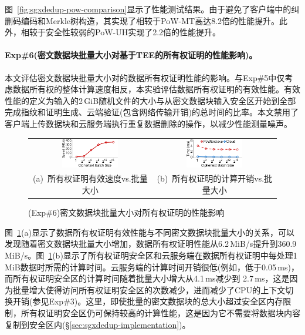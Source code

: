 图~\ref{fig:sgxdedup-pow-comparison}显示了性能测试结果。由于\sysnameS 避免了客户端中的纠删码编码和Merkle树构造，其实现了相较于PoW-MT高达8.2倍的性能提升。此外，\sysnameS 相较于安全性较弱的PoW-UH实现了2.2倍的性能提升。

\paragraph*{Exp\#6(密文数据块批量大小对基于TEE的所有权证明的性能影响)。}本文评估密文数据块批量大小对\sysnameS 的数据所有权证明性能的影响。与Exp\#5中仅考虑数据所有权的整体计算速度相反，本实验评估数据所有权证明的有效性能。有效性能的定义为输入的2\,GiB随机文件的大小与从密文数据块输入安全区开始到全部完成指纹和证明生成、云端验证(包含网络传输开销)的总时间的比率。本文禁用了客户端上传数据块和云服务端执行重复数据删除的操作，以减少性能测量噪声。

\begin{figure}[!htb]
    \centering
    \begin{tabular}{@{\ }c@{\ }c}
        \includegraphics[width=0.48\textwidth]{pic/sgxdedup/plot/exp_a4/expa4_powBatchSize_overall.pdf} & 
        \includegraphics[width=0.48\textwidth]{pic/sgxdedup/plot/exp_a4/expa4_powBatchSize_breakdown.pdf}  \\
        \mbox{\parbox{0.48\textwidth}{\small (a) 所有权证明有效速度vs.批量大小}}                        & 
        \mbox{\parbox{0.48\textwidth}{\small (b) 所有权证明的计算开销vs.批量大小}}
    \end{tabular}
    \caption{(Exp\#6)密文数据块批量大小对所有权证明的性能影响}
    \label{fig:sgxdedup-exp-pow-impact}
\end{figure}

图~\ref{fig:sgxdedup-exp-pow-impact}(a)显示了数据所有权证明有效性能与不同密文数据块批量大小的关系，可以发现随着密文数据块批量大小增加，数据所有权证明性能从6.2\,MiB/s提升到360.9\,MiB/s。图~\ref{fig:sgxdedup-exp-pow-impact}(b)显示了所有权证明安全区和云服务端在数据所有权证明中每处理1\,MiB数据时所需的计算时间。云服务端的计算时间开销很低(例如，低于0.05\,ms)，而所有权证明安全区的计算时间随着批量大小增大从4.1\,ms减少到 2.7\,ms，这是因为批量增大使得访问所有权证明安全区的次数减少，进而减少了CPU的上下文切换开销(参见Exp\#3)。这里，即使批量的密文数据块的总大小超过安全区内存限制，所有权证明安全区仍可保持较高的计算性能，这是因为它不需要将数据块内容复制到安全区内(\S\ref{sec:sgxdedup-implementation})。



